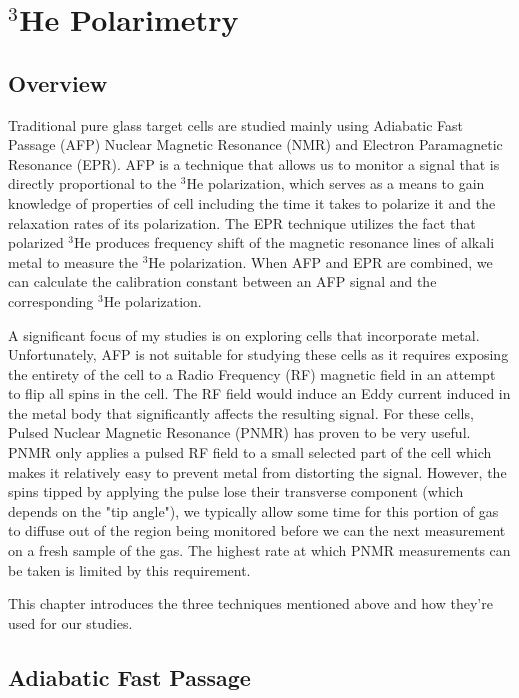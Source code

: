 \chapter{$^{3}$He Polarimetry}
\label{chap:chap3}

\section{Overview}

Traditional pure glass target cells are studied mainly using Adiabatic Fast Passage (AFP) Nuclear Magnetic Resonance (NMR) and Electron Paramagnetic Resonance (EPR). AFP is a technique that allows us to monitor a signal that is directly proportional to the $^{3}$He polarization, which serves as a means to gain knowledge of properties of cell including the time it takes to polarize it and the relaxation rates of its polarization. The EPR technique utilizes the fact that polarized $^{3}$He produces frequency shift of the magnetic resonance lines of alkali metal to measure the $^{3}$He polarization. When AFP and EPR are combined, we can calculate the calibration constant between an AFP signal and the corresponding $^{3}$He polarization. 

A significant focus of my studies is on exploring cells that incorporate metal. Unfortunately, AFP is not suitable for studying these cells as it requires exposing the entirety of the cell to a Radio Frequency (RF) magnetic field in an attempt to flip all spins in the cell. The RF field would induce an Eddy current induced in the metal body that significantly affects the resulting signal. For these cells, Pulsed Nuclear Magnetic Resonance (PNMR) has proven to be very useful. PNMR only applies a pulsed RF field to a small selected part of the cell which makes it relatively easy to prevent metal from distorting the signal. However, the spins tipped by applying the pulse lose their transverse component (which depends on the "tip angle"), we typically allow some time for this portion of gas to diffuse out of the region being monitored before we can the next measurement on a fresh sample of the gas. The highest rate at which PNMR measurements can be taken is limited by this requirement.

This chapter introduces the three techniques mentioned above and how they're used for our studies.

\section{Adiabatic Fast Passage}

